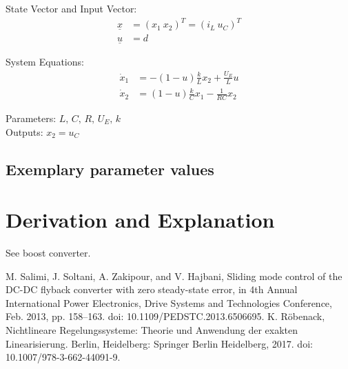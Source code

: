\documentclass[10pt,a4paper]{article}
\begin{document}
	State Vector and Input Vector:
	\begin{align*}
		\underline{x} &= (x_1 \ x_2)^T = (i_L \ u_C)^T \\
		\underline{u} &= d
	\end{align*}
	
	\noindent System Equations:			
	\begin{subequations}
	\begin{align}
		\dot{x}_1 &= -(1-u)\frac{k}{L}x_2 + \frac{U_E}{L}u \\
		\dot{x}_2 &= (1-u)\frac{k}{C}x_1 - \frac{1}{RC}x_2
	\end{align}
	\end{subequations}

	\noindent
	Parameters: $L, \, C, \, R, \, U_E, \, k$ %
	\\
	Outputs: $x_2 = u_C$
	
	
	
	
	\subsection{Exemplary parameter values}
	

	
	\section{Derivation and Explanation} %
	See boost converter.
	
	
	\begin{thebibliography}{10}		
		M. Salimi, J. Soltani, A. Zakipour, and V. Hajbani, Sliding mode control of the DC-DC flyback converter with zero steady-state error, in 4th Annual International Power Electronics, Drive Systems and Technologies Conference, Feb. 2013, pp. 158–163. doi: 10.1109/PEDSTC.2013.6506695.
		K. Röbenack, Nichtlineare Regelungssysteme: Theorie und Anwendung der exakten Linearisierung. Berlin, Heidelberg: Springer Berlin Heidelberg, 2017. doi: 10.1007/978-3-662-44091-9.
	\end{thebibliography}
\end{document}

